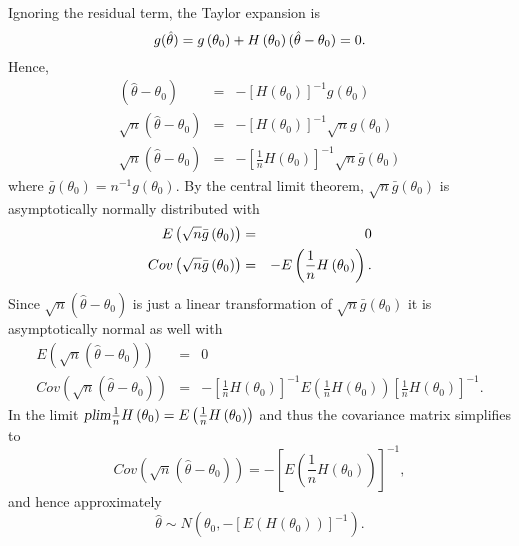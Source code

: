 \documentclass{article}
\begin{document}
Ignoring the residual term, the Taylor expansion is%
\begin{equation*}
g(\hat{\theta})=g\left( \theta _{0}\right) +H\left( \theta _{0}\right) (\hat{%
\theta}-\theta _{0})=0.
\end{equation*}%
Hence,%
\begin{eqnarray*}
(\hat{\theta}-\theta _{0}) &=&-\left[ H\left( \theta _{0}\right) \right]
^{-1}g\left( \theta _{0}\right) \\
\sqrt{n}(\hat{\theta}-\theta _{0}) &=&-\left[ H\left( \theta _{0}\right) %
\right] ^{-1}\sqrt{n}g\left( \theta _{0}\right) \\
\sqrt{n}(\hat{\theta}-\theta _{0}) &=&-\left[ \frac{1}{n}H\left( \theta
_{0}\right) \right] ^{-1}\sqrt{n}\bar{g}\left( \theta _{0}\right)
\end{eqnarray*}%
where $\bar{g}\left( \theta _{0}\right) =n^{-1}g\left( \theta _{0}\right) $.
By the central limit theorem, $\sqrt{n}\bar{g}\left( \theta _{0}\right) $ is
asymptotically normally distributed with%
\begin{eqnarray*}
E\left( \sqrt{n}\bar{g}\left( \theta _{0}\right) \right) &=&0 \\
Cov\left( \sqrt{n}\bar{g}\left( \theta _{0}\right) \right) &=&-E\left( \frac{%
1}{n}H\left( \theta _{0}\right) \right) .
\end{eqnarray*}%
Since $\sqrt{n}(\hat{\theta}-\theta _{0})$ is just a linear transformation
of $\sqrt{n}\bar{g}\left( \theta _{0}\right) $ it is asymptotically normal
as well with%
\begin{eqnarray*}
E\left( \sqrt{n}(\hat{\theta}-\theta _{0})\right) &=&0 \\
Cov\left( \sqrt{n}(\hat{\theta}-\theta _{0})\right) &=&-\left[ \frac{1}{n}%
H\left( \theta _{0}\right) \right] ^{-1}E\left( \frac{1}{n}H\left( \theta
_{0}\right) \right) \left[ \frac{1}{n}H\left( \theta _{0}\right) \right]
^{-1}.
\end{eqnarray*}%
In the limit $\textsl{plim}\frac{1}{n}H\left( \theta _{0}\right) =E\left(
\frac{1}{n}H\left( \theta _{0}\right) \right) $ and thus the covariance
matrix simplifies to%
\begin{equation*}
Cov\left( \sqrt{n}(\hat{\theta}-\theta _{0})\right) =-\left[ E\left( \frac{1%
}{n}H\left( \theta _{0}\right) \right) \right] ^{-1},
\end{equation*}%
and hence approximately%
\begin{equation*}
\hat{\theta}\sim N\left( \theta _{0},-\left[ E\left( H\left( \theta
_{0}\right) \right) \right] ^{-1}\right) .
\end{equation*}
\end{document}
